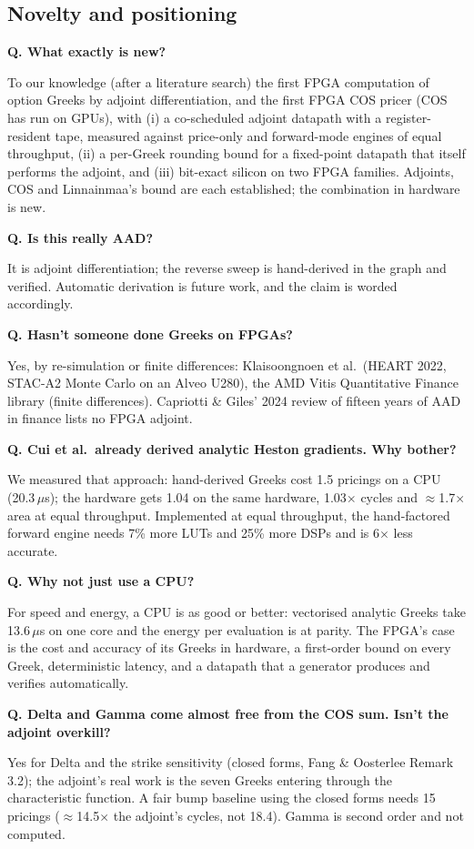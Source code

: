 \documentclass[11pt,a4paper]{article}
\newcounter{qn}
\newcommand{\qa}[2]{\stepcounter{qn}\par\medskip\noindent\textbf{Q\theqn. #1}\par\noindent #2\par}
\begin{document}
\subsection{Novelty and positioning}
\qa{What exactly is new?}{To our knowledge (after a literature search) the first FPGA computation of option Greeks by adjoint differentiation, and the first FPGA COS pricer (COS has run on GPUs), with (i) a co-scheduled adjoint datapath with a register-resident tape, measured against price-only and forward-mode engines of equal throughput, (ii) a per-Greek rounding bound for a fixed-point datapath that itself performs the adjoint, and (iii) bit-exact silicon on two FPGA families. Adjoints, COS and Linnainmaa's bound are each established; the combination in hardware is new.}
\qa{Is this really AAD?}{It is adjoint differentiation; the reverse sweep is hand-derived in the graph and verified. Automatic derivation is future work, and the claim is worded accordingly.}
\qa{Hasn't someone done Greeks on FPGAs?}{Yes, by re-simulation or finite differences: Klaisoongnoen et al.\ (HEART 2022, STAC-A2 Monte Carlo on an Alveo U280), the AMD Vitis Quantitative Finance library (finite differences). Capriotti \& Giles' 2024 review of fifteen years of AAD in finance lists no FPGA adjoint.}
\qa{Cui et al.\ already derived analytic Heston gradients. Why bother?}{We measured that approach: hand-derived Greeks cost 1.5 pricings on a CPU (20.3\,$\mu$s); the hardware gets 1.04 on the same hardware, 1.03$\times$ cycles and $\approx$1.7$\times$ area at equal throughput. Implemented at equal throughput, the hand-factored forward engine needs 7\% more LUTs and 25\% more DSPs and is 6$\times$ less accurate.}
\qa{Why not just use a CPU?}{For speed and energy, a CPU is as good or better: vectorised analytic Greeks take 13.6\,$\mu$s on one core and the energy per evaluation is at parity. The FPGA's case is the cost and accuracy of its Greeks in hardware, a first-order bound on every Greek, deterministic latency, and a datapath that a generator produces and verifies automatically.}
\qa{Delta and Gamma come almost free from the COS sum. Isn't the adjoint overkill?}{Yes for Delta and the strike sensitivity (closed forms, Fang \& Oosterlee Remark 3.2); the adjoint's real work is the seven Greeks entering through the characteristic function. A fair bump baseline using the closed forms needs 15 pricings ($\approx$14.5$\times$ the adjoint's cycles, not 18.4). Gamma is second order and not computed.}
\end{document}
